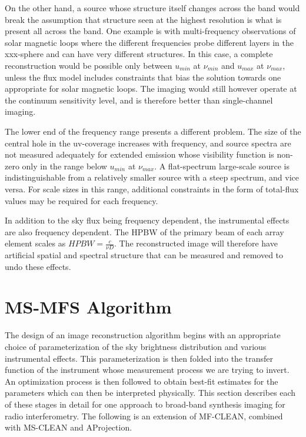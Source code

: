 \documentclass[structabstract]{aa}
\begin{document}
On the other hand, a source whose structure itself changes across the band would break the
assumption that structure seen at the highest resolution is what is present all across the band.
One example is with multi-frequency observations of solar magnetic loops
where the different frequencies probe different layers in the xxx-sphere and can have
very different structures. In this case, a complete reconstruction would be possible only
between $u_{min}$ at $\nu_{min}$ and  $u_{max}$ at $\nu_{max}$, unless the flux model
includes constraints that bias the solution towards one appropriate for solar magnetic loops.
The imaging would still however operate at the continuum sensitivity level, and is therefore
better than single-channel imaging.

The lower end of the frequency range presents a different problem. 
The size of the central hole in the uv-coverage
increases with frequency, and source spectra are not measured adequately for
extended emission whose visibility function is non-zero only in
the range below $u_{min}$ at $\nu_{max}$. A flat-spectrum large-scale source is 
indistinguishable from a relatively smaller source with a steep spectrum, and vice versa.
For scale sizes in this range, additional constraints in the form 
of total-flux values may be required for each frequency.

In addition to the sky flux being frequency dependent, the instrumental effects are also 
frequency dependent.
The HPBW of the primary beam of each array element scales as $HPBW = \frac{c}{\nu D}$. 
The reconstructed image will therefore have artificial spatial and spectral structure that can be
measured and removed to undo these effects.

\section{MS-MFS Algorithm}\label{ALGORITHMS}
The design of an image reconstruction algorithm begins with an appropriate choice of
parameterization of the sky brightness distribution and various instrumental effects.
This parameterization is then folded into the transfer function of the instrument
whose measurement process we are trying to invert. An optimization process is then
followed to obtain best-fit estimates for the parameters which can then be 
interpreted physically. This section describes each
of these stages in detail for one approach to broad-band synthesis imaging 
for radio interferometry.
The following is an extension of MF-CLEAN, combined with MS-CLEAN and AProjection.
\end{document}
